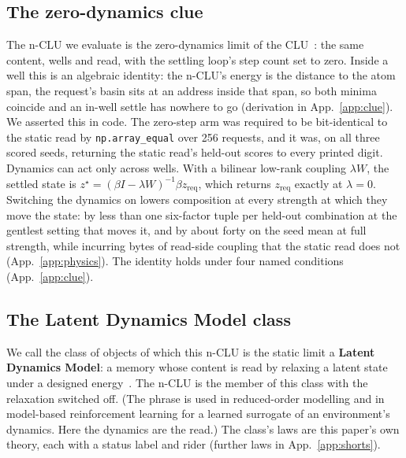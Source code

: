 \documentclass{article} %
\begin{document}
\subsection{The zero-dynamics clue}
\label{sec:clue}

The n-CLU we evaluate is the zero-dynamics limit of the CLU~\citep{jawahar2026chlu}: the same content, wells and read,
with the settling loop's step count set to zero. Inside a well this is an algebraic identity: the n-CLU's energy is the distance to the atom span, the request's basin sits at an address inside that span, so both minima coincide and an in-well settle has nowhere
to go (derivation in App.~\ref{app:clue}). We asserted this in code. The zero-step arm was required to be bit-identical to
the static read by \texttt{np.array\_equal} over 256 requests, and it was, on all three scored
seeds, returning the static read's held-out scores to every printed digit. %
Dynamics can act only across wells. With a bilinear low-rank coupling $\lambda W$, the settled
state is $z^\star=(\beta I-\lambda W)^{-1}\beta z_{\text{req}}$, which returns
$z_{\text{req}}$ exactly at $\lambda=0$. Switching the dynamics on lowers composition at every
strength at which they move the state: by less than one six-factor tuple per
held-out combination at the gentlest setting that moves it, and by about forty on the seed mean at full strength, while incurring bytes of read-side coupling that the static read does not (App.~\ref{app:physics}). %
The identity holds under four named conditions (App.~\ref{app:clue}).

\subsection{The Latent Dynamics Model class}
\label{sec:theory}

We call the class of objects of which this n-CLU is the static limit a \textbf{Latent Dynamics
Model}: a memory whose content is read by relaxing a latent state under a designed energy~\citep{hopfield_neural_1982,krotov_dense_2016,ramsauer_hopfield_2021,hoover_energy_2023,kong_reservoir-computing_2024}. The
n-CLU is the member of this class with the relaxation switched off. (The phrase is used in
reduced-order modelling and in model-based reinforcement learning for a learned surrogate of an
environment's dynamics. Here the dynamics are the read.) The class's laws are this paper's own theory, each with a status label and rider (further laws in
App.~\ref{app:shorts}).
\end{document}
